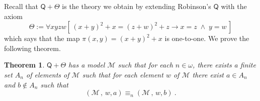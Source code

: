 \documentclass[10pt,a4paper, openany,  oldfontcommands]{memoir}
\newtheorem{theorem}{Theorem}
\newtheorem{open problem} [theorem] {Open Problem}
\newtheorem{open question} [theorem] {Open Question}
\begin{document}
Recall that  $  \mathsf{Q} +  \Theta $  is the theory we obtain by extending Robinson's  $  \mathsf{Q} $  with the axiom 
\[
\Theta :=   \forall xy z w  \left[  \,   (x+y)^2 + x = (z+w)^2 + z \rightarrow x = z  \;  \wedge  \;  y = w  \,  \right] 
\]
which  says that the map  $  \pi  (x, y ) = (x+y)^2 + x $ is one-to-one. 
We prove the following theorem.






\begin{theorem}  \label{QPLUSCANTORPAIRING}
$  \mathsf{Q} +  \Theta  $ has a  model $  \mathcal{M} $  
such that for each $ n \in  \omega $,   there exists   a    finite set  $  A_n  $  of elements of  $  \mathcal{M} $
   such that for each  element  $w $  of   $  \mathcal{M} $  there exist  $  a  \in  A_n  $  and  $ b  \not\in A_n  $   such that 
\[
  \left( \mathcal{M}   \, , \,  w  ,    a    \right)  \equiv_n    \left( \mathcal{M}   \, , \,  w  ,    b     \right)    
  \     .
  \]
\end{theorem}
\end{document}
